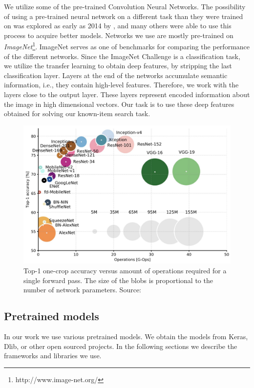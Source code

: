 We utilize some of the pre-trained Convolution Neural Networks. The possibility of using a pre-trained neural network on a different task than they were trained on was explored as early as 2014 by \cite{donahuedeep}, and many others were able to use this process to acquire better models.  Networks we use are mostly pre-trained on \emph{ImageNet}\footnote{http://www.image-net.org/}. ImageNet serves as one of benchmarks for comparing the performance of the different networks. Since the ImageNet Challenge is a classification task, we utilize the transfer learning to obtain deep features, by stripping the last classification layer. Layers at the end of the networks accumulate semantic information, i.e., they contain high-level features. Therefore, we work with the layers close to the output layer. These layers represent encoded information about the image in high dimensional vectors. Our task is to use these deep features obtained for solving our known-item search task.

\begin{figure}
    \centering
	\includegraphics[width=0.8\linewidth]{img/network-comparison.jpeg}
	\caption{Top-1 one-crop accuracy versus amount of operations required for a single forward pass. The size of the blobs is proportional to the number of network parameters. Source: \cite{canziani2016analysis}}
	\label{fig:camera-setup}
\end{figure}

\subsection{Pretrained models}
\label{ss:pretrained_models}

In our work we use various pretrained models. We obtain the models from Keras, Dlib, or other open sourced projects. In the following sections we describe the frameworks and libraries we use.

